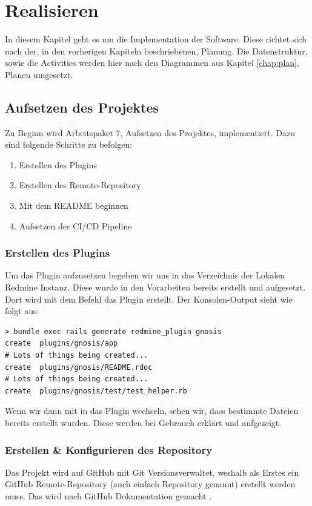 \chapter{Realisieren}
In diesem Kapitel geht es um die Implementation der Software. Diese richtet sich nach der, in den vorherigen
Kapiteln beschriebenen, Planung. Die Datenstruktur, sowie die Activities werden hier nach den Diagrammen aus
Kapitel \ref{chap:plan}, Planen umgesetzt.

\section{Aufsetzen des Projektes}
Zu Beginn wird Arbeitspaket 7, Aufsetzen des Projektes, implementiert. Dazu sind folgende Schritte zu befolgen:
\begin{enumerate}
  \item Erstellen des Plugins
  \item Erstellen des Remote-Repository
  \item Mit dem README beginnen
  \item Aufsetzen der CI/CD Pipeline
\end{enumerate}

\subsection{Erstellen des Plugins}
Um das Plugin aufzusetzen begeben wir uns in das Verzeichnis der Lokalen Redmine Instanz. Diese wurde in den
Vorarbeiten bereits erstellt und aufgesetzt. \newline
Dort wird mit dem Befehl  das Plugin erstellt. Der
Konsolen-Output sieht wie folgt aus:
\begin{codebox}[]
  \begin{verbatim}
> bundle exec rails generate redmine_plugin gnosis
create  plugins/gnosis/app
# Lots of things being created...
create  plugins/gnosis/README.rdoc
# Lots of things being created...
create  plugins/gnosis/test/test_helper.rb
  \end{verbatim}
\end{codebox}

Wenn wir dann mit  in das Plugin wechseln, sehen wir, dass bestimmte Dateien
bereits erstellt wurden. Diese werden bei Gebrauch erklärt und aufgezeigt.

\subsection{Erstellen \& Konfigurieren des Repository}
Das Projekt wird auf GitHub mit Git Versionsverwaltet, weshalb als Erstes ein GitHub Remote-Repository (auch einfach
Repository genannt) erstellt werden muss. Das wird nach GitHub Dokumentation gemacht \cite{github_create_repo}.


